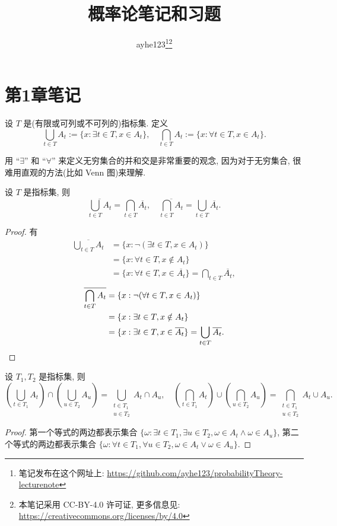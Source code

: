 \documentclass[color=black,device=normal,lang=cn]{elegantnote}
\date{\zhtoday}
\title{概率论笔记和习题}
\author{ayhe123\thanks{笔记发布在这个网址上: \url{https://github.com/ayhe123/probabilityTheory-lecturenote}}\thanks{本笔记采用 CC-BY-4.0 许可证, 更多信息见: \url{https://creativecommons.org/licenses/by/4.0}}}
\numberwithin{equation}{section}
\theoremstyle{plain}
\numberwithin{exercise}{exsection}
\begin{document}
\maketitle
\section{第1章笔记}
设 $T$ 是(有限或可列或不可列的)指标集. 定义
\begin{equation}\label{eq1.1}
    \bigcup\limits_{t\in T}A_t:=\{x:\exists t\in T,x\in A_t\},\quad\bigcap\limits_{t\in T}A_t:=\{x:\forall t\in T,x\in A_t\}.
\end{equation}

用 ``$\exists$'' 和 ``$\forall$'' 来定义无穷集合的并和交是非常重要的观念, 因为对于无穷集合, 很难用直观的方法(比如 Venn 图)来理解.
\begin{theorem}[De-Morgan]\label{t1.1}
    设 $T$ 是指标集, 则
    \[\overline{\bigcup\limits_{t\in T}A_t}=\bigcap\limits_{t\in T}\overline{A_t},\quad\overline{\bigcap\limits_{t\in T}A_t}=\bigcup\limits_{t\in T}\overline{A_t}.\]
\end{theorem}
\begin{proof}
    有
    \begin{align*}
        \overline{\bigcup\limits_{t\in T}A_t} & =\{x:\neg(\exists t\in T,x\in A_t)\} \\
        & =\{x:\forall t\in T,x\notin A_t\} \\
        & =\{x:\forall t\in T,x\in \overline{A_t}\}=\bigcap\limits_{t\in T}\overline{A_t},
    \end{align*}
    \begin{align*}
        \overline{\bigcap\limits_{t\in T}A_t} & =\{x:\neg(\forall t\in T,x\in A_t)\} \\
        & =\{x:\exists t\in T,x\notin A_t\} \\
        & =\{x:\exists t\in T,x\in\overline{A_t}\}=\bigcup\limits_{t\in T}\overline{A_t}.\qedhere
    \end{align*}
\end{proof}
\begin{theorem}\label{t1.2}
    设 $T_1,T_2$ 是指标集, 则
    \[\left(\bigcup\limits_{t\in T_1}A_t\right)\cap\left(\bigcup\limits_{u\in T_2}A_u\right)=\bigcup\limits_{\substack{t\in T_1\\u\in T_2}}A_t\cap A_u,\quad\left(\bigcap\limits_{t\in T_1}A_t\right)\cup\left(\bigcap\limits_{u\in T_2}A_u\right)=\bigcap\limits_{\substack{t\in T_1\\u\in T_2}}A_t\cup A_u.\]
\end{theorem}
\begin{proof}
    第一个等式的两边都表示集合 $\{\omega:\exists t\in T_1,\exists u\in T_2,\omega\in A_t\wedge\omega\in A_u\}$, 第二个等式的两边都表示集合 $\{\omega:\forall t\in T_1,\forall u\in T_2,\omega\in A_t\vee\omega\in A_u\}$.
\end{proof}
\end{document}
